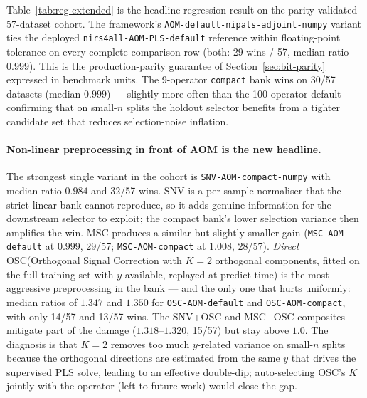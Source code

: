 \documentclass[review,a4paper]{elsarticle}
\newcommand{\AOM}{\textsc{AOM}\xspace}
\newcommand{\PLS}{\textsc{PLS}\xspace}
\newcommand{\SNV}{\textsc{SNV}\xspace}
\newcommand{\MSC}{\textsc{MSC}\xspace}
\newcommand{\OSC}{\textsc{OSC}\xspace}
\begin{document}
\begin{table}[t]
\centering
\caption{Per-variant absolute RMSEP statistics across the cohort.
Mean RMSEP is dominated by a small number of large-magnitude datasets
(MALARIA in particular) and should be read alongside the median.
Generated from \texttt{publication/tables/summary\_per\_variant.csv}.}
\label{tab:reg-main}

\end{table}

Table~\ref{tab:reg-extended} is the headline regression result on the
parity-validated 57-dataset cohort. The framework's
\verb|AOM-default-nipals-adjoint-numpy| variant ties the deployed
\verb|nirs4all-AOM-PLS-default| reference within floating-point
tolerance on every complete comparison row (both: 29 wins / 57,
median ratio $0.999$). This is the production-parity guarantee of
Section~\ref{sec:bit-parity} expressed in benchmark units. The
9-operator \texttt{compact} bank wins on 30/57
datasets (median $0.999$) — slightly more often than the 100-operator
default — confirming that on small-$n$ splits the holdout selector
benefits from a tighter candidate set that reduces selection-noise
inflation.

\paragraph{Non-linear preprocessing in front of \AOM is the new
headline.} The strongest single variant in the cohort is
\texttt{SNV-AOM-compact-numpy} with median ratio $0.984$ and 32/57
wins. \SNV is a per-sample normaliser that the strict-linear bank
cannot reproduce, so it adds genuine information for the downstream
selector to exploit; the compact bank's lower selection variance then
amplifies the win. \MSC produces a similar but slightly smaller gain
(\texttt{MSC-AOM-default} at $0.999$, 29/57; \texttt{MSC-AOM-compact}
at $1.008$, 28/57). \emph{Direct} \OSC (Orthogonal Signal Correction
with $K{=}2$ orthogonal components, fitted on the full training set
with $y$ available, replayed at predict time) is the most aggressive
preprocessing in the bank — and the only one that hurts uniformly:
median ratios of $1.347$ and $1.350$ for \texttt{OSC-AOM-default} and
\texttt{OSC-AOM-compact}, with only 14/57 and 13/57 wins. The
\SNV+\OSC and \MSC+\OSC composites mitigate part of the damage
($1.318$--$1.320$, 15/57) but stay above $1.0$. The diagnosis is that
$K{=}2$ removes too much $y$-related variance on small-$n$ splits
because the orthogonal directions are estimated from the same $y$
that drives the supervised \PLS solve, leading to an effective
double-dip; auto-selecting \OSC's $K$ jointly with the operator (left
to future work) would close the gap.
\end{document}
